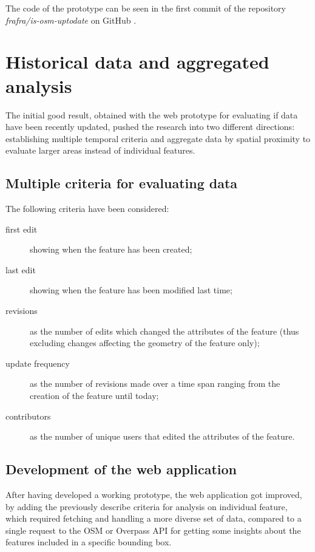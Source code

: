 \documentclass{Configuration_Files/PoliMi3i_thesis}
\begin{document}
The code of the prototype can be seen in the first commit of the repository \textit{frafra/is-osm-uptodate} on GitHub \cite{InitialImportFrafra}.

\section{Historical data and aggregated analysis}

The initial good result, obtained with the web prototype for evaluating if data have been recently updated, pushed the research into two different directions: establishing multiple temporal criteria and aggregate data by spatial proximity to evaluate larger areas instead of individual features.

\subsection{Multiple criteria for evaluating data}
\label{subsec:criteria_historical}

The following criteria have been considered:

\begin{description}
    \item[first edit] showing when the feature has been created;
    \item[last edit] showing when the feature has been modified last time;
    \item[revisions] as the number of edits which changed the attributes of the feature (thus excluding changes affecting the geometry of the feature only);
    \item[update frequency] as the number of revisions made over a time span ranging from the creation of the feature until today;
    \item[contributors] as the number of unique users that edited the attributes of the feature.
\end{description}

\subsection{Development of the web application}

After having developed a working prototype, the web application got improved, by adding the previously describe criteria for analysis on individual feature, which required fetching and handling a more diverse set of data, compared to a single request to the OSM or Overpass API for getting some insights about the features included in a specific bounding box.
\end{document}

